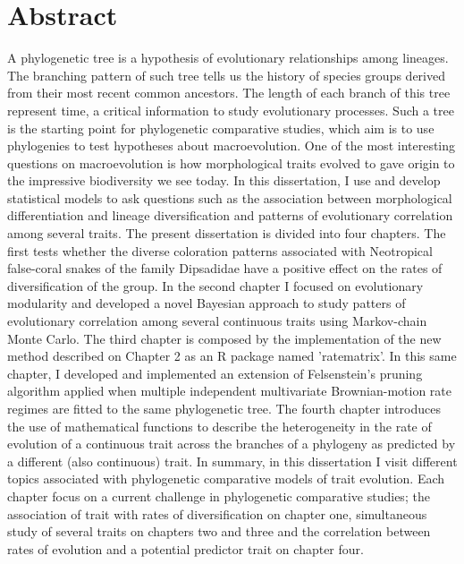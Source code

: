 \section*{\large{Abstract}}

A phylogenetic tree is a hypothesis of evolutionary relationships among lineages. The branching pattern of such tree tells us the history of species groups derived from their most recent common ancestors. The length of each branch of this tree represent time, a critical information to study evolutionary processes. Such a tree is the starting point for phylogenetic comparative studies, which aim is to use phylogenies to test hypotheses about macroevolution. One of the most interesting questions on macroevolution is how morphological traits evolved to gave origin to the impressive biodiversity we see today. In this dissertation, I use and develop statistical models to ask questions such as the association between morphological differentiation and lineage diversification and patterns of evolutionary correlation among several traits. The present dissertation is divided into four chapters. The first tests whether the diverse coloration patterns associated with Neotropical false-coral snakes of the family Dipsadidae have a positive effect on the rates of diversification of the group. In the second chapter I focused on evolutionary modularity and developed a novel Bayesian approach to study patters of evolutionary correlation among several continuous traits using Markov-chain Monte Carlo. The third chapter is composed by the implementation of the new method described on Chapter 2 as an R package named 'ratematrix'. In this same chapter, I developed and implemented an extension of Felsenstein's pruning algorithm applied when multiple independent multivariate Brownian-motion rate regimes are fitted to the same phylogenetic tree. The fourth chapter introduces the use of mathematical functions to describe the heterogeneity in the rate of evolution of a continuous trait across the branches of a phylogeny as predicted by a different (also continuous) trait. In summary, in this dissertation I visit different topics associated with phylogenetic comparative models of trait evolution. Each chapter focus on a current challenge in phylogenetic comparative studies; the association of trait with rates of diversification on chapter one, simultaneous study of several traits on chapters two and three and the correlation between rates of evolution and a potential predictor trait on chapter four.

